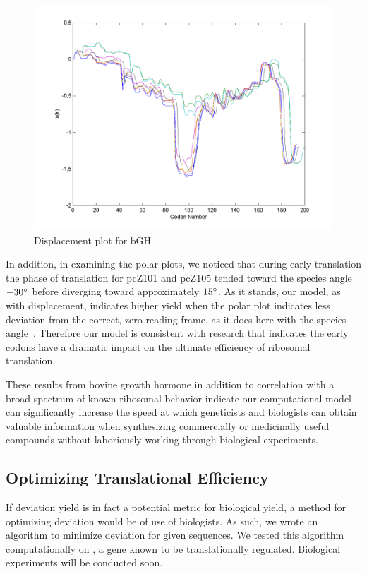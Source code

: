 \documentclass[12pt]{article}
\numberwithin{equation}{section}
\begin{document}
\begin{figure}
  \centering
  \caption{Displacement plot for bGH}
  \label{bgh:disp}
  \includegraphics[scale=0.4]{bgh/all}
\end{figure}

In addition, in examining the polar plots, we noticed that during
early translation the phase of translation for pcZ101 and pcZ105 tended toward the species
angle $-30^\circ$ before diverging toward approximately $15^\circ$. As
it stands, our model, as with displacement, indicates higher yield when the polar plot
indicates less deviation from the correct, zero reading frame, as it
does here with the species angle~\cite{lalit:mechanics}. Therefore our
model is consistent with research that indicates
the early codons have a dramatic impact on the ultimate efficiency of
ribosomal translation.

These results from bovine growth hormone in addition to correlation with a broad
spectrum of known ribosomal behavior indicate our computational model
can significantly increase the speed at which geneticists and
biologists can obtain valuable information when synthesizing
commercially or medicinally useful compounds without laboriously
working through biological experiments.

\subsection{Optimizing Translational Efficiency}

If deviation yield is in fact a potential metric for biological yield,
a method for optimizing deviation would be of use of biologists.  As such,
we wrote an algorithm to minimize deviation for given sequences.
We tested this algorithm computationally on \rpoS, a gene known to
be translationally regulated.  Biological experiments will be
conducted soon.
\end{document}
